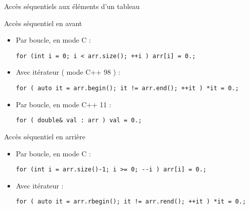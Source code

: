 \documentclass[handout,10pt]{beamer}
\begin{document}
\begin{frame}[fragile]{Accès séquentiels aux éléments d'un tableau}
\tiny
\begin{block}{Accès séquentiel en avant}
\begin{itemize}
\item Par boucle, en mode C :
\begin{lstlisting}
for (int i = 0; i < arr.size(); ++i ) arr[i] = 0.;
\end{lstlisting}
\item Avec itérateur ( mode C++ 98 ) :
\begin{lstlisting}
for ( auto it = arr.begin(); it != arr.end(); ++it ) *it = 0.;
\end{lstlisting}
\item Par boucle, en mode C++ 11 :
\begin{lstlisting}
for ( double& val : arr ) val = 0.;
\end{lstlisting}
\end{itemize}
\end{block}

\begin{block}{Accès séquentiel en arrière}
\begin{itemize}
\item Par boucle, en mode C :
\begin{lstlisting}
for (int i = arr.size()-1; i >= 0; --i ) arr[i] = 0.;
\end{lstlisting}
\item Avec itérateur  :
\begin{lstlisting}
for ( auto it = arr.rbegin(); it != arr.rend(); ++it ) *it = 0.;
\end{lstlisting}
\end{itemize}
\end{block}

\end{frame}
\end{document}

